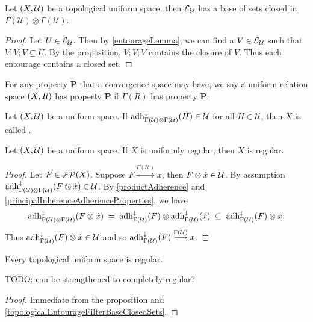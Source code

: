 \begin{corollary} \label{topologicalEntourageFilterBaseClosedSets}
Let $\sSet{X,\mathcal{U}}$ be a topological uniform space, then $\operatorname{\mathcal{E}}_\mathcal{U}$ has a base of sets closed in $\Gamma(\mathcal{U})\otimes \Gamma(\mathcal{U})$.
\end{corollary}
\begin{proof}
Let $U\in \operatorname{\mathcal{E}}_\mathcal{U}$. Then by \ref{entourageLemma}, we can find a $V\in\operatorname{\mathcal{E}}_\mathcal{U}$ such that $V;V;V\subseteq U$. By the proposition, $V;V;V$ contains the closure of $V$. Thus each entourage contains a closed set.
\end{proof}

\begin{definition}
For any property $\mathbf{P}$ that a convergence space may have, we say a uniform relation space $\sSet{X,R}$ has property $\mathbf{P}$ if $\Gamma(R)$ has property $\mathbf{P}$.
\end{definition}

\begin{definition}
Let $\sSet{X,\mathcal{U}}$ be a uniform space. If $\operatorname{adh}_{\Gamma(\mathcal{U})\otimes \Gamma(\mathcal{U})}^\downarrow(H) \in \mathcal{U}$ for all $H\in \mathcal{U}$, then $X$ is called .
\end{definition}

\begin{proposition}
Let $\sSet{X,\mathcal{U}}$ be a uniform space. If $X$ is uniformly regular, then $X$ is regular.
\end{proposition}
\begin{proof}
Let $F\in \operatorname{\mathcal{FP}}(X)$. Suppose $F\overset{\Gamma(\mathcal{U})}{\longrightarrow} x$, then $F\otimes \dot{x} \in \mathcal{U}$. By assumption $\operatorname{adh}_{\Gamma(\mathcal{U})\otimes \Gamma(\mathcal{U})}^\downarrow(F\otimes \dot{x}) \in \mathcal{U}$. By \ref{productAdherence} and \ref{principalInherenceAdherenceProperties}, we have
\[ \operatorname{adh}_{\Gamma(\mathcal{U})\otimes \Gamma(\mathcal{U})}^\downarrow(F\otimes \dot{x}) \; = \; \operatorname{adh}_{\Gamma(\mathcal{U})}^\downarrow(F)\otimes \operatorname{adh}_{\Gamma(\mathcal{U})}^\downarrow(\dot{x}) \; \subseteq \; \operatorname{adh}_{\Gamma(\mathcal{U})}^\downarrow(F)\otimes \dot{x}. \]
Thus $\operatorname{adh}_{\Gamma(\mathcal{U})}^\downarrow(F)\otimes \dot{x} \in\mathcal{U}$ and so $\operatorname{adh}_{\Gamma(\mathcal{U})}^\downarrow(F) \overset{\Gamma(\mathcal{U})}{\longrightarrow} x$.
\end{proof}
\begin{corollary} \label{topologicalUniformSpaceRegular}
Every topological uniform space is regular.
\end{corollary}
TODO: can be strengthened to completely regular?
\begin{proof}
Immediate from the proposition and \ref{topologicalEntourageFilterBaseClosedSets}.
\end{proof}

